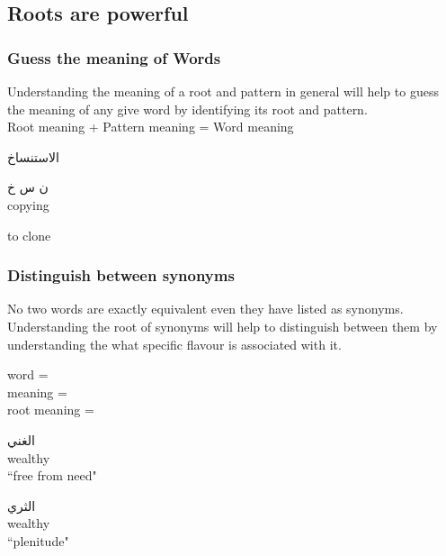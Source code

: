 \subsection{Roots are powerful}


\subsubsection{Guess the meaning of Words}
Understanding the meaning of a root and pattern in general will help to guess the meaning of any give word by identifying its root and pattern.\\


Root meaning + Pattern meaning = Word meaning \\

\begin{minipage}{.33\textwidth}
	\textarabic{الاستنساخ}
\end{minipage}
\begin{minipage}{.33\textwidth}
	\textarabic{ن س خ} \\ copying
\end{minipage}
\begin{minipage}{.33\textwidth}
	to clone
\end{minipage}

\subsubsection{Distinguish between synonyms}
No two words are exactly equivalent even they have listed as synonyms.
Understanding the root of synonyms will help to distinguish between them by understanding the what specific flavour is associated with it. \\ 

\begin{minipage}{.33\textwidth}
	word = \\ meaning = \\ root meaning =
\end{minipage}
\begin{minipage}{.33\textwidth}
	\textarabic{الغني} \\ wealthy \\ ``free from need"
\end{minipage}
\begin{minipage}{.33\textwidth}
	\textarabic{الثري} \\ wealthy \\ ``plenitude"
\end{minipage}
	

